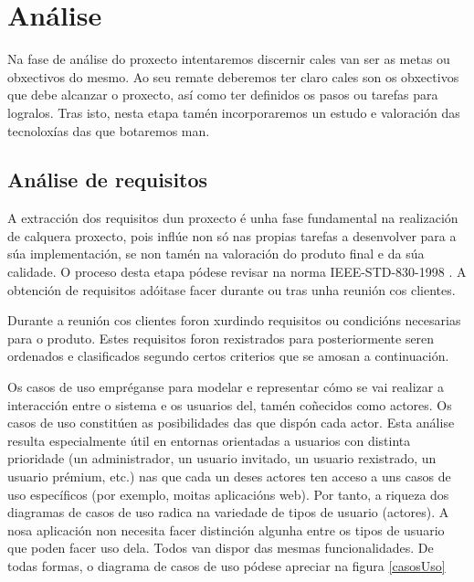 \chapter{Análise}

Na fase de análise do proxecto intentaremos discernir cales van ser as metas ou obxectivos do mesmo. Ao seu remate deberemos ter claro cales son os obxectivos que debe alcanzar o proxecto, así como ter definidos os pasos ou tarefas para logralos. Tras isto, nesta etapa tamén incorporaremos un estudo e valoración das tecnoloxías das que botaremos man.

\section{Análise de requisitos}

A extracción dos requisitos dun proxecto é unha fase fundamental na realización de calquera proxecto, pois inflúe non só nas propias tarefas a desenvolver para a súa implementación, se non tamén na valoración do produto final e da súa calidade. O proceso desta etapa pódese revisar na norma IEEE-STD-830-1998 \cite{ieee-std-830-1998}. A obtención de requisitos adóitase facer durante ou tras unha reunión cos clientes.

Durante a reunión cos clientes foron xurdindo requisitos ou condicións necesarias para o produto. Estes requisitos foron rexistrados para posteriormente seren ordenados e clasificados segundo certos criterios que se amosan a continuación.

Os casos de uso empréganse para modelar e representar cómo se vai realizar a interacción entre o sistema e os usuarios del, tamén coñecidos como actores. Os casos de uso constitúen as posibilidades das que dispón cada actor. Esta análise resulta especialmente útil en entornas orientadas a usuarios con distinta prioridade (un administrador, un usuario invitado, un usuario rexistrado, un usuario prémium, etc.) nas que cada un deses actores ten acceso a uns casos de uso específicos (por exemplo, moitas aplicacións web). Por tanto, a riqueza dos diagramas de casos de uso radica na variedade de tipos de usuario (actores). A nosa aplicación non necesita facer distinción algunha entre os tipos de usuario que poden facer uso dela. Todos van dispor das mesmas funcionalidades. De todas formas, o diagrama de casos de uso pódese apreciar na figura \ref{casosUso}

